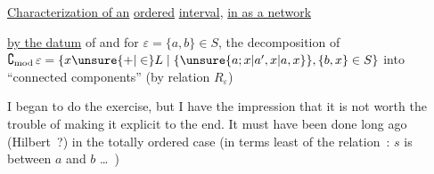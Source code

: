 \uline{Characterization of an} \uline{ordered}  \uline{interval}, \uline{in  as a network}

\uline{by the datum} of
and for $\varepsilon=\{a,b\}\in S$, the decomposition of  $\complement_{\mathrm{mod}}\,\varepsilon=\{x\unsure{+|\in}L\mid\{\unsure{a;x|a',x|a,x}\},\{b,x\}\in S\}$ into ``connected components'' (by relation $R_\varepsilon$)

I began to do the exercise, but I have the impression that it is not worth the trouble of making it explicit to the end. It must have been done long ago (Hilbert~?) in the totally ordered  case (in terms  least of the relation~: $s$ is between $a$ and $b$ \ldots\ )
